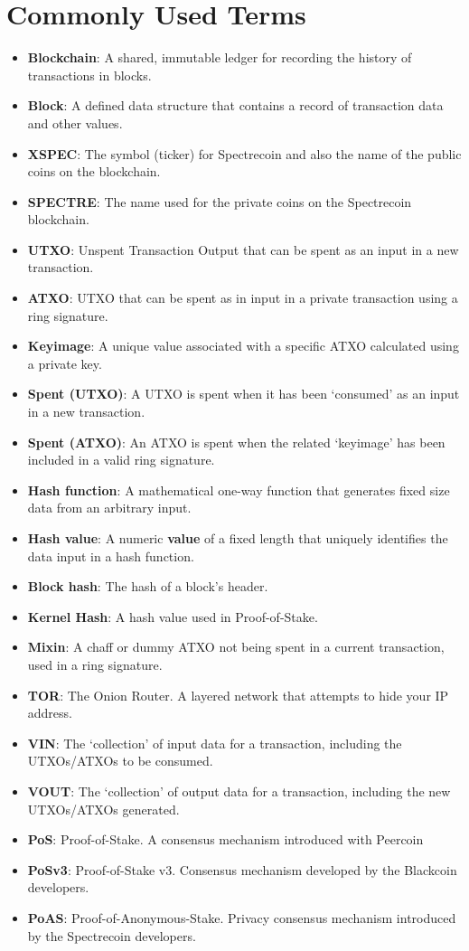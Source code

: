 \chapter{Commonly Used Terms}
\begin{itemize}
	\item \textbf{Blockchain}: A shared, immutable ledger for recording the history of transactions in blocks. 
	\item \textbf{Block}: A defined data structure that contains a record of transaction data and other values. 
	\item \textbf{XSPEC}: The symbol (ticker) for Spectrecoin and also the name of the public coins on the blockchain. 
	\item \textbf{SPECTRE}: The name used for the private coins on the Spectrecoin blockchain. 
	\item \textbf{UTXO}: Unspent Transaction Output that can be spent as an input in a new transaction. 
	\item \textbf{ATXO}: UTXO that can be spent as in input in a private transaction using a ring signature. 
	\item \textbf{Keyimage}: A unique value associated with a specific ATXO calculated using a private key. 
	\item \textbf{Spent (UTXO)}: A UTXO is spent when it has been ‘consumed’ as an input in a new transaction. 
	\item \textbf{Spent (ATXO)}: An ATXO is spent when the related ‘keyimage’ has been included in a valid ring signature. 
	\item \textbf{Hash function}: A mathematical one-way function that generates fixed size data from an arbitrary input. 
	\item \textbf{Hash value}: A numeric \textbf{value} of a fixed length that uniquely identifies the data input in a hash function. 
	\item \textbf{Block hash}: The hash of a block's header. 
	\item \textbf{Kernel Hash}: A hash value used in Proof-of-Stake. 
	\item \textbf{Mixin}: A chaff or dummy ATXO not being spent in a current transaction, used in a ring signature. 
	\item \textbf{TOR}: The Onion Router. A layered network that attempts to hide your IP address. 
	\item \textbf{VIN}: The ‘collection’ of input data for a transaction, including the UTXOs/ATXOs to be consumed. 
	\item \textbf{VOUT}: The ‘collection’ of output data for a transaction, including the new UTXOs/ATXOs generated. 
	\item \textbf{PoS}: Proof-of-Stake. A consensus mechanism introduced with Peercoin 
	\item \textbf{PoSv3}: Proof-of-Stake v3. Consensus mechanism developed by the Blackcoin developers. 
	\item \textbf{PoAS}: Proof-of-Anonymous-Stake. Privacy consensus mechanism introduced by the Spectrecoin developers. 
\end{itemize}

